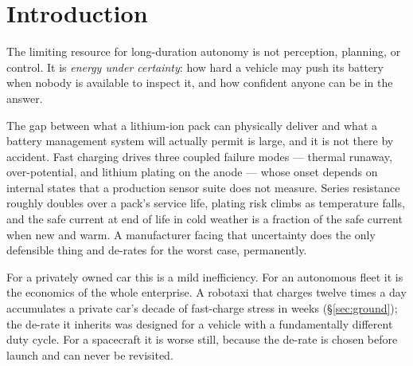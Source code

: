 \documentclass[11pt,letterpaper]{article}
\theoremstyle{definition}
\theoremstyle{remark}
\newcommand{\SI}[2]{#1\,#2}
\newcommand{\micro}{$\mu$}
\begin{document}
\begin{abstract}
constraint is an interval, so this is the bisection that solves that problem exactly. We validate the
two assumptions against \nCells{} cells measured by another laboratory, the filter against a
Doyle--Fuller--Newman plant on charge and on discharge, and the generality against a
\SI{\mtPower}{kW} permanent-magnet traction motor certified by the identical code at the same proved
cost. The filter compiles to \SI{\fwText}{B} and \SI{\fwRam}{B} of RAM, worst case
\SI{\fwUsMax}{\micro s}. Across \vPlatforms{} platforms in four media and \vExperiments{} experiments totalling
\vTotalEpisodes{} episodes nothing was breached while the certificate reported feasible.
Twenty-one experiments contradicted the hypothesis they were written to test and are reported as
findings, among them two media of four where the incumbent is not beaten and a cycle-life benefit
that DFN degradation does not support.
\end{abstract}

\section{Introduction}

The limiting resource for long-duration autonomy is not perception, planning, or control. It is
\emph{energy under certainty}: how hard a vehicle may push its battery when nobody is available
to inspect it, and how confident anyone can be in the answer.

The gap between what a lithium-ion pack can physically deliver and what a battery management
system will actually permit is large, and it is not there by accident. Fast charging drives
three coupled failure modes --- thermal runaway, over-potential, and lithium plating on the
anode --- whose onset depends on internal states that a production sensor suite does not
measure. Series resistance roughly doubles over a pack's service life, plating risk climbs as
temperature falls, and the safe current at end of life in cold weather is a fraction of the
safe current when new and warm. A manufacturer facing that uncertainty does the only defensible
thing and de-rates for the worst case, permanently.

For a privately owned car this is a mild inefficiency. For an autonomous fleet it is the
economics of the whole enterprise. A robotaxi that charges twelve times a day accumulates a
private car's decade of fast-charge stress in \gWeeks{} weeks (\S\ref{sec:ground}); the
de-rate it inherits was designed for a vehicle with a fundamentally different duty cycle. For a
spacecraft it is worse still, because the de-rate is chosen before launch and can never be
revisited.
\end{document}
